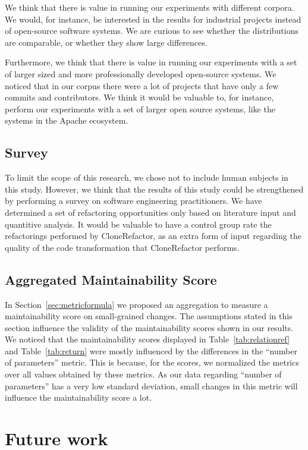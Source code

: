 We think that there is value in running our experiments with different corpora. We would, for instance, be interested in the results for industrial projects instead of open-source software systems. We are curious to see whether the distributions are comparable, or whether they show large differences.

Furthermore, we think that there is value in running our experiments with a set of larger sized and more professionally developed open-source systems. We noticed that in our corpus there were a lot of projects that have only a few commits and contributors. We think it would be valuable to, for instance, perform our experiments with a set of larger open source systems, like the systems in the Apache ecosystem.

\subsection{Survey}
To limit the scope of this research, we chose not to include human subjects in this study. However, we think that the results of this study could be strengthened by performing a survey on software engineering practitioners. We have determined a set of refactoring opportunities only based on literature input and quantitive analysis. It would be valuable to have a control group rate the refactorings performed by CloneRefactor, as an extra form of input regarding the quality of the code transformation that CloneRefactor performs.

\subsection{Aggregated Maintainability Score}
In Section~\ref{sec:metricformula} we proposed an aggregation to measure a maintainability score on small-grained changes. The assumptions stated in this section influence the validity of the maintainability scores shown in our results. We noticed that the maintainability scores displayed in Table~\ref{tab:relationref} and Table~\ref{tab:return} were mostly influenced by the differences in the ``number of parameters'' metric. This is because, for the scores, we normalized the metrics over all values obtained by these metrics. As our data regarding ``number of parameters'' has a very low standard deviation, small changes in this metric will influence the maintainability score a lot.

\section{Future work} \label{sec:future_work}

